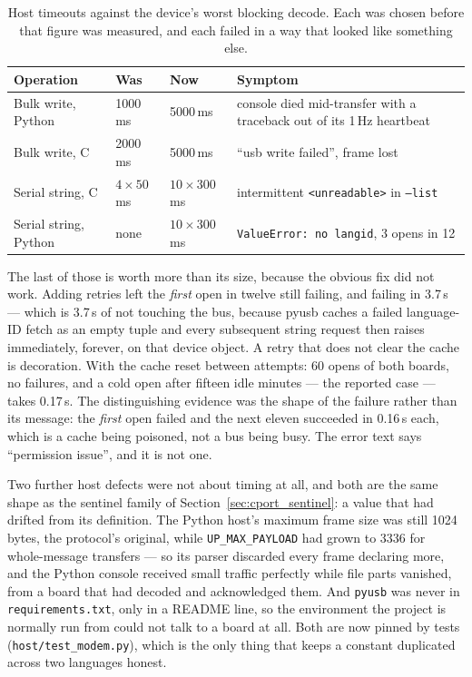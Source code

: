 \begin{table}[H]
    \centering
    \caption{Host timeouts against the device's worst blocking decode.
             Each was chosen before that figure was measured, and each
             failed in a way that looked like something else.}
    \label{tab:host_timeouts}
    \small
    \begin{tabular}{@{}lllp{4.6cm}@{}}
    \toprule
    \textbf{Operation} & \textbf{Was} & \textbf{Now} &
    \textbf{Symptom} \\
    \midrule
    Bulk write, Python & 1000\,ms & 5000\,ms &
    console died mid-transfer with a traceback out of its 1\,Hz
    heartbeat \\
    Bulk write, C & 2000\,ms & 5000\,ms &
    ``usb write failed'', frame lost \\
    Serial string, C & $4\times50$\,ms & $10\times300$\,ms &
    intermittent \texttt{<unreadable>} in \texttt{--list} \\
    Serial string, Python & none & $10\times300$\,ms &
    \texttt{ValueError: no langid}, 3 opens in 12 \\
    \bottomrule
    \end{tabular}
\end{table}

The last of those is worth more than its size, because the obvious fix
did not work.  Adding retries left the \emph{first} open in twelve
still failing, and failing in 3.7\,s --- which is 3.7\,s of not
touching the bus, because pyusb caches a failed language-ID fetch as an
empty tuple and every subsequent string request then raises
immediately, forever, on that device object.  A retry that does not
clear the cache is decoration.  With the cache reset between attempts:
60 opens of both boards, no failures, and a cold open after fifteen
idle minutes --- the reported case --- takes 0.17\,s.  The
distinguishing evidence was the shape of the failure rather than its
message: the \emph{first} open failed and the next eleven succeeded in
0.16\,s each, which is a cache being poisoned, not a bus being busy.
The error text says ``permission issue'', and it is not one.

Two further host defects were not about timing at all, and both are the
same shape as the sentinel family of Section~\ref{sec:cport_sentinel}:
a value that had drifted from its definition.  The Python host's
maximum frame size was still 1024\,bytes, the protocol's original,
while \texttt{UP\_MAX\_PAYLOAD} had grown to 3336 for whole-message
transfers --- so its parser discarded every frame declaring more, and
the Python console received small traffic perfectly while file parts
vanished, from a board that had decoded and acknowledged them.  And
\texttt{pyusb} was never in \texttt{requirements.txt}, only in a README
line, so the environment the project is normally run from could not
talk to a board at all.  Both are now pinned by tests
(\texttt{host/test\_modem.py}), which is the only thing that keeps a
constant duplicated across two languages honest.

